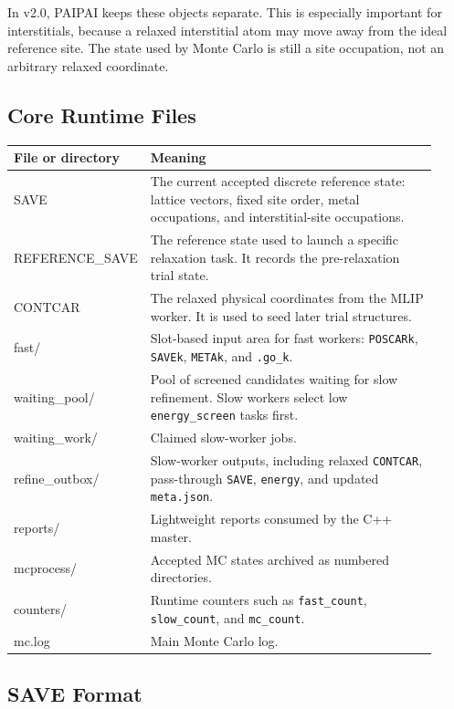 \documentclass[11pt]{article}
\newcommand{\PAIPAI}{\textsc{PAIPAI}}
\begin{document}
In v2.0, \PAIPAI{} keeps these objects separate. This is especially important for interstitials, because a relaxed interstitial atom may move away from the ideal reference site. The state used by Monte Carlo is still a site occupation, not an arbitrary relaxed coordinate.

\subsection{Core Runtime Files}

\begin{longtable}{>{\ttfamily}p{0.22\linewidth}p{0.70\linewidth}}
\toprule
File or directory & Meaning \\
\midrule
\endhead
SAVE & The current accepted discrete reference state: lattice vectors, fixed site order, metal occupations, and interstitial-site occupations. \\
REFERENCE\_SAVE & The reference state used to launch a specific relaxation task. It records the pre-relaxation trial state. \\
CONTCAR & The relaxed physical coordinates from the MLIP worker. It is used to seed later trial structures. \\
fast/ & Slot-based input area for fast workers: \texttt{POSCARk}, \texttt{SAVEk}, \texttt{METAk}, and \texttt{.go\_k}. \\
waiting\_pool/ & Pool of screened candidates waiting for slow refinement. Slow workers select low \texttt{energy\_screen} tasks first. \\
waiting\_work/ & Claimed slow-worker jobs. \\
refine\_outbox/ & Slow-worker outputs, including relaxed \texttt{CONTCAR}, pass-through \texttt{SAVE}, \texttt{energy}, and updated \texttt{meta.json}. \\
reports/ & Lightweight reports consumed by the C++ master. \\
mcprocess/ & Accepted MC states archived as numbered directories. \\
counters/ & Runtime counters such as \texttt{fast\_count}, \texttt{slow\_count}, and \texttt{mc\_count}. \\
mc.log & Main Monte Carlo log. \\
\bottomrule
\end{longtable}

\subsection{SAVE Format}
\end{document}

